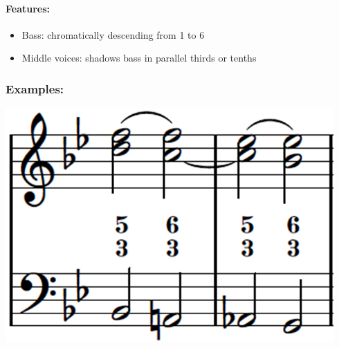 \documentclass[11pt, openany]{article}
\begin{document}
\paragraph{Features:}
\begin{itemize}
\item Bass: chromatically descending from 1 to 6
\item Middle voices: shadows bass in parallel thirds or tenths
\end{itemize}

\subsubsection{Examples:}
\begin{center}
\includegraphics[scale=0.4]{waldstein.png}
\end{center}
\end{document}
